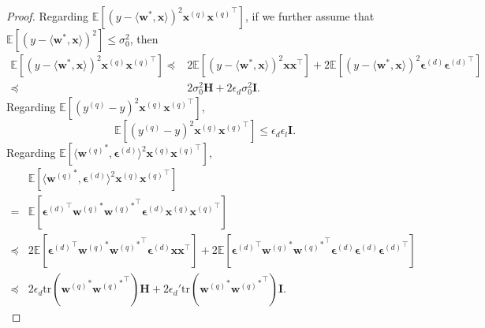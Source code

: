 \documentclass[11pt, letterpaper]{article}
\begin{document}
\begin{proof}
    Regarding $\mathbb{E}\left[(y-\langle \mathbf{w}^*,\mathbf{x}\rangle)^2{\mathbf{x}^{(q)}}{\mathbf{x}^{(q)}}^\top\right]$, if we further assume that $\mathbb{E}\left[(y-\langle \mathbf{w}^*,\mathbf{x}\rangle)^2\right]\leq \sigma_0^2$, then
    \begin{equation}
    \label{G13}
        \begin{aligned}
            \mathbb{E}\left[(y-\langle \mathbf{w}^*,\mathbf{x}\rangle)^2{\mathbf{x}^{(q)}}{\mathbf{x}^{(q)}}^\top\right] \preceq& 2\mathbb{E}\left[(y-\langle \mathbf{w}^*,\mathbf{x}\rangle)^2{\mathbf{x}}{\mathbf{x}}^\top\right]+2\mathbb{E}\left[(y-\langle \mathbf{w}^*,\mathbf{x}\rangle)^2{\boldsymbol{\epsilon}^{(d)}}{\boldsymbol{\epsilon}^{(d)}}^\top\right]\\
            \preceq & 2\sigma_0^2 \mathbf{H}+2\epsilon_d\sigma_0^2  \mathbf{I}.
        \end{aligned}
    \end{equation}
    Regarding $\mathbb{E}\left[(y^{(q)}-y)^2{\mathbf{x}^{(q)}}{\mathbf{x}^{(q)}}^\top\right]$,
    \begin{equation}
    \label{G14}
        \mathbb{E}\left[(y^{(q)}-y)^2{\mathbf{x}^{(q)}}{\mathbf{x}^{(q)}}^\top\right] \leq \epsilon_d\epsilon_l\mathbf{I}.
    \end{equation}
    Regarding $\mathbb{E}\left[\langle {\mathbf{w}^{(q)}}^*,\boldsymbol{\epsilon}^{(d)}\rangle^2{\mathbf{x}^{(q)}}{\mathbf{x}^{(q)}}^\top\right]$,
    \begin{equation}
    \label{G15}
        \begin{aligned}
            &\mathbb{E}\left[\langle {\mathbf{w}^{(q)}}^*,\boldsymbol{\epsilon}^{(d)}\rangle^2{\mathbf{x}^{(q)}}{\mathbf{x}^{(q)}}^\top\right]\\
            =&\mathbb{E}\left[{\boldsymbol{\epsilon}^{(d)}}^\top{\mathbf{w}^{(q)}}^*{{\mathbf{w}^{(q)}}^*}^\top \boldsymbol{\epsilon}^{(d)}{\mathbf{x}^{(q)}}{\mathbf{x}^{(q)}}^\top\right]\\
            \preceq & 2\mathbb{E}\left[{\boldsymbol{\epsilon}^{(d)}}^\top{\mathbf{w}^{(q)}}^*{{\mathbf{w}^{(q)}}^*}^\top \boldsymbol{\epsilon}^{(d)}{\mathbf{x}}{\mathbf{x}}^\top\right]+2\mathbb{E}\left[{\boldsymbol{\epsilon}^{(d)}}^\top{\mathbf{w}^{(q)}}^*{{\mathbf{w}^{(q)}}^*}^\top \boldsymbol{\epsilon}^{(d)}{\boldsymbol{\epsilon}^{(d)}}{\boldsymbol{\epsilon}^{(d)}}^\top\right]\\
            \preceq & 2\epsilon_d\mathrm{tr}({\mathbf{w}^{(q)}}^*{{\mathbf{w}^{(q)}}^*}^\top)\mathbf{H}+2\epsilon_d' \mathrm{tr}({\mathbf{w}^{(q)}}^*{{\mathbf{w}^{(q)}}^*}^\top)\mathbf{I}.

\end{aligned}
\end{equation}
\end{proof}
\end{document}
